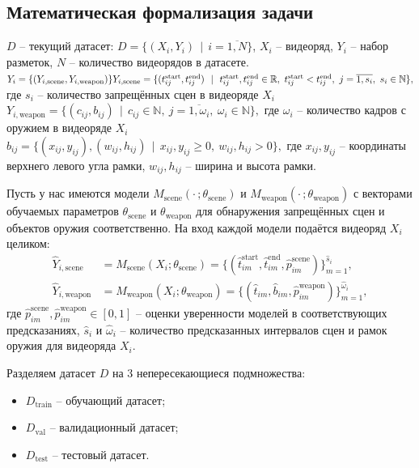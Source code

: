 \documentclass[a4paper,14pt]{extarticle}
\begin{document}
    \subsection{Математическая формализация задачи}
    $D$ -- текущий датасет: $D = \{ (X_i, Y_i) ~~ | ~~ i = \overline{1, N} \}$, $X_i$ -- видеоряд, $Y_i$ -- набор разметок, $N$ -- количество видеорядов в датасете. \\
    $
    Y_i = \{ (Y_{i,\text{scene}}, Y_{i,\text{weapon}}) \} \\
    Y_{i,\text{scene}} = \{(t_{ij}^{\text{start}}, t_{ij}^{\text{end}}) ~~|~~ t_{ij}^{\text{start}}, t_{ij}^{\text{end}} \in \mathbb{R}, ~ t_{ij}^{\text{start}} < t_{ij}^{\text{end}}, ~ j = \overline{1, s_i}, ~ s_i \in \mathbb{N} \},
    $
    где $s_i$ -- количество запрещённых сцен в видеоряде $X_i$ \\
    $
    Y_{i,\text{weapon}} = \{ (c_{ij}, b_{ij}) ~~|~~ c_{ij} \in \mathbb{N}, ~ j = \overline{1, \omega_i}, ~ \omega_i \in \mathbb{N} \},
    $
    где $\omega_i$ -- количество кадров с оружием в видеоряде $X_i$ \\
    $
    b_{ij} = \{ (x_{ij}, y_{ij}), (w_{ij}, h_{ij}) ~~|~~ x_{ij}, y_{ij} \geq 0, ~ w_{ij}, h_{ij} > 0 \},
    $
    где $x_{ij}, y_{ij}$ -- координаты верхнего левого угла рамки, $w_{ij}, h_{ij}$ -- ширина и высота рамки.

    Пусть у нас имеются модели $M_{\text{scene}}(\cdot\,; \theta_{\text{scene}})$ и $M_{\text{weapon}}(\cdot\,; \theta_{\text{weapon}})$ с векторами обучаемых параметров $\theta_{\text{scene}}$ и $\theta_{\text{weapon}}$ для обнаружения запрещённых сцен и объектов оружия соответственно. На вход каждой модели подаётся видеоряд $X_i$ целиком:
    \begin{align*}
        \hat{Y}_{i,\text{scene}} &= M_{\text{scene}}(X_i; \theta_{\text{scene}}) = \big\{ (\hat{t}_{im}^{\text{start}}, \hat{t}_{im}^{\text{end}}, \hat{p}_{im}^{\text{scene}}) \big\}_{m=1}^{\hat{s}_i}, \\
        \hat{Y}_{i,\text{weapon}} &= M_{\text{weapon}}(X_i; \theta_{\text{weapon}}) = \big\{ (\hat{t}_{im}, \hat{b}_{im}, \hat{p}_{im}^{\text{weapon}}) \big\}_{m=1}^{\hat{\omega}_i},
    \end{align*}
    где $\hat{p}_{im}^{\text{scene}}, \hat{p}_{im}^{\text{weapon}} \in [0, 1]$ -- оценки уверенности моделей в соответствующих предсказаниях, $\hat{s}_i$ и $\hat{\omega}_i$ -- количество предсказанных интервалов сцен и рамок оружия для видеоряда $X_i$.

    Разделяем датасет $D$ на 3 непересекающиеся подмножества:
    \begin{itemize}
        \item $D_{\text{train}}$ -- обучающий датасет;
        \item $D_{\text{val}}$ -- валидационный датасет;
        \item $D_{\text{test}}$ -- тестовый датасет.
    \end{itemize}
\end{document}
